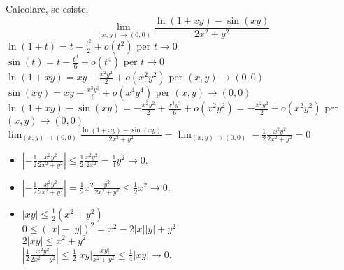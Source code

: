 \begin{exbar}
\begin{example}
	Calcolare, se esiste,
	\begin{equation*}
		\lim_{(x,y)\rightarrow (0,0)}\frac{\ln(1+xy)-\sin(xy)}{2x^2+y^2}
	\end{equation*}
	$\ln(1+t)=t-\frac{t^2}{2}+o(t^2)$ per $t \rightarrow 0$\\
	$\sin(t)=t-\frac{t^3}{6}+o(t^4)$ per $t \rightarrow 0$\\
	$\ln(1+xy)=xy-\frac{x^2y^2}{2}+o(x^2y^2)$ per $(x,y)\rightarrow (0,0)$\\
	$\sin(xy)=xy-\frac{x^3y^3}{6}+o(x^4y^4)$ per $(x,y)\rightarrow (0,0)$\\
	$\ln(1+xy)-\sin(xy)=-\frac{x^2y^2}{2}+\frac{x^3y^3}{6}+o(x^2y^2)=-\frac{x^2y^2}{2}+o(x^2y^2)$ per $(x,y)\rightarrow (0,0)$\\
	$\lim_{(x,y)\rightarrow(0,0)}\frac{\ln(1+xy)-\sin(xy)}{2x^2+y^2}=\lim_{(x,y)\rightarrow(0,0)} -\frac{1}{2}\frac{x^2y^2}{2x^2+y^2}=0$
	\begin{itemize}
		\item $|-\frac{1}{2}\frac{x^2y^2}{2x^2+y^2}|\leq \frac{1}{2}\frac{x^2y^2}{2x^2}=\frac{1}{4}y^2\rightarrow 0$.
		\item $|-\frac{1}{2}\frac{x^2y^2}{2x^2+y^2}|=\frac{1}{2}x^2\frac{y^2}{2x^2+y^2}\leq \frac{1}{2}x^2\rightarrow 0$.
		\item $|xy|\leq \frac{1}{2}(x^2+y^2)$\\
		$0 \leq (|x|-|y|)^2=x^2-2|x||y|+y^2$\\
		$2|xy|\leq x^2+y^2$\\
		$|\frac{1}{2}\frac{x^2y^2}{2x^2+y^2}|\leq \frac{1}{2}|xy|\frac{|xy|}{x^2+y^2}\leq \frac{1}{4}|xy|\rightarrow 0$.
	\end{itemize}
\end{example}	
\end{exbar}


